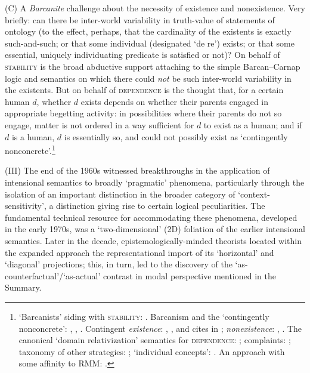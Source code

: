 \documentclass[12pt]{article}
\begin{document}
(C) A \emph{Barcanite} challenge about the necessity of existence and
nonexistence. Very briefly: can there be inter-world variability in
truth-value of statements of ontology (to the effect, perhaps, that the
cardinality of the existents is exactly such-and-such; or that some individual
(designated `de re') exists; or that some essential, uniquely individuating 
predicate is satisfied or not)? On behalf of \textsc{stability} is the broad
abductive support attaching to the simple Barcan--Carnap logic and semantics
on which there could \emph{not} be such inter-world variability in the
existents. But on behalf of \textsc{dependence} is the thought that, for a
certain human $d$, whether $d$ exists depends on whether their parents engaged
in appropriate begetting activity: in possibilities where their parents do not so
engage, matter is not ordered in a way sufficient for $d$ to exist as a human;
and if $d$ is a human, $d$ is essentially so, and could not possibly exist as
`contingently nonconcrete'.\footnote{`Barcanists' siding with
\textsc{stability}:
\citep{zalta88,linskyzalta94,linskyzalta96,williamson98bp,williamson13}.
Barcanism and the `contingently nonconcrete': \citep{linskyzalta96},
\citep[p.~266]{williamson98bp}, \citep{williamson13}. Contingent
\emph{existence}: \citep[p.~257]{garson84}, \citep[p.~258]{williamson98bp},
and cites in \citep[ch.~1]{williamson13}; \emph{nonexistence}:
\citep[pp.~65--6]{kripke63}, \citep[p.~258]{williamson98bp}. The canonical
`domain relativization' semantics for \textsc{dependence}:
\citep{kripke63,stalnaker94}; complaints:
\citep{garson84,Garson2005-GARUQM-2,williamson98bp,williamson13}; taxonomy of
other strategies: \citep[p.~250]{garson84}; `individual concepts':
\citep{thomason69,Garson2005-GARUQM-2}. An approach with some affinity to RMM:
\citep{fineneno}.}

\smallskip{}

(III) The end of the 1960s witnessed breakthroughs in the application of
intensional semantics to broadly `pragmatic' phenomena, particularly through
the isolation of an important distinction in the broader category of
`context-sensitivity', a distinction giving rise to certain logical
peculiarities. The fundamental technical resource for accommodating these
phenomena, developed in the early 1970s, was a `two-dimensional' (2D)
foliation of the earlier intensional semantics. Later in the decade,
epistemologically-minded theorists located within the expanded approach the
representational import of its `horizontal' and `diagonal' projections; this,
in turn, led to the discovery of the `as-counterfactual'/`as-actual' contrast
in modal perspective mentioned in the Summary.
\end{document}
